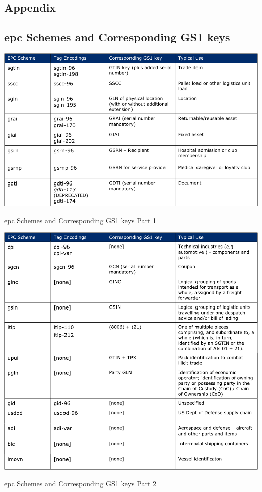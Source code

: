 \renewcommand{\thesection}{\Alph{section}}

\begin{appendices}
\chapter{Appendix}

\section{\ac{epc} Schemes and Corresponding GS1 keys} \label{anx:epccodingschemes}
\begin{table}[!ht]
    \centering
    \includegraphics[width=\textwidth]{./figs/02-state-of-the-art/epcschemes.pdf}
    \caption[\acs{epc} Schemes and Corresponding GS1 keys Part 1]{\acs{epc} Schemes and Corresponding GS1 keys Part 1~\cite{EPCTagData}}
\end{table}

\begin{table}
    \centering
    \includegraphics[width=\textwidth]{./figs/02-state-of-the-art/epcschemes2.pdf}
    \caption[\acs{epc} Schemes and Corresponding GS1 keys Part 2]{\acs{epc} Schemes and Corresponding GS1 keys Part 2~\cite{EPCTagData}}
\end{table}


\end{appendices}
